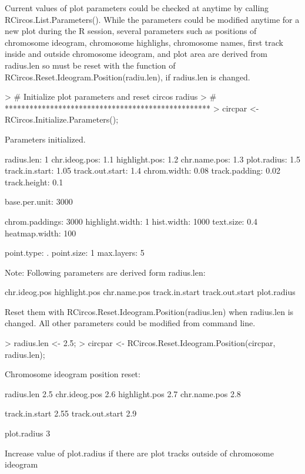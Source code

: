 \documentclass{article}
\begin{document}
Current values of plot parameters could be checked at anytime by calling RCircos.List.Parameters(). While the parameters could be modified anytime for a new plot during the R session, several parameters such as positions of chromosome ideogram, chromosome highlighs, chromosome names, first track inside and outside chromosome ideogram, and plot area are derived from radius.len so must be reset with the function of RCircos.Reset.Ideogram.Position(radiu.len), if radius.len is changed.

\begin{Schunk}
\begin{Sinput}
> #	Initialize plot parameters and reset circos radius
> #	**************************************************
> circpar <- RCircos.Initialize.Parameters();
\end{Sinput}
\begin{Soutput}
Parameters initialized.

radius.len:	 1 
chr.ideog.pos:	 1.1 
highlight.pos:	 1.2 
chr.name.pos:	 1.3 
plot.radius:	 1.5 
track.in.start:	 1.05 
track.out.start: 1.4 
chrom.width:	 0.08 
track.padding:	 0.02 
track.height:	 0.1 

base.per.unit:	 3000 

chrom.paddings:	 3000 
highlight.width:	 1 
hist.width:	 1000 
text.size:	 0.4 
heatmap.width:	 100 

point.type:	 . 
point.size:	 1 
max.layers:	 5 

Note: Following parameters are derived form radius.len:

chr.ideog.pos
highlight.pos
chr.name.pos
track.in.start
track.out.start
plot.radius

Reset them with RCircos.Reset.Ideogram.Position(radius.len)
when radius.len is changed. All other parameters could be 
modified from command line.
\end{Soutput}
\begin{Sinput}
> radius.len <- 2.5;
> circpar <- RCircos.Reset.Ideogram.Position(circpar, radius.len);
\end{Sinput}
\begin{Soutput}
Chromosome ideogram position reset:

radius.len 2.5 
chr.ideog.pos 2.6 
highlight.pos 2.7 
chr.name.pos 2.8 

track.in.start 2.55 
track.out.start 2.9 

plot.radius 3 

Increase value of plot.radius if there are plot tracks
outside of chromosome ideogram
\end{Soutput}
\end{Schunk}
\end{document}
